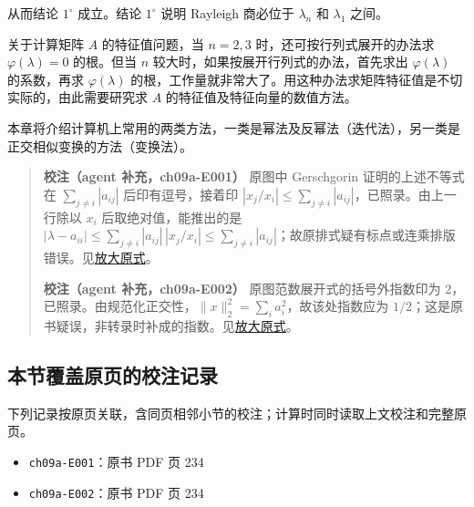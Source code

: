 \documentclass[
  10pt,
  fontset=fandol]{ctexart}
\providecommand{\tightlist}{%
  \setlength{\itemsep}{0pt}\setlength{\parskip}{0pt}}
\begin{document}
从而结论 \(1^\circ\) 成立。结论 \(1^\circ\) 说明 Rayleigh 商必位于 \(\lambda_n\) 和 \(\lambda_1\) 之间。

关于计算矩阵 \(A\) 的特征值问题，当 \(n=2,3\) 时，还可按行列式展开的办法求 \(\varphi(\lambda)=0\) 的根。但当 \(n\) 较大时，如果按展开行列式的办法，首先求出 \(\varphi(\lambda)\) 的系数，再求 \(\varphi(\lambda)\) 的根，工作量就非常大了。用这种办法求矩阵特征值是不切实际的，由此需要研究求 \(A\) 的特征值及特征向量的数值方法。

本章将介绍计算机上常用的两类方法，一类是幂法及反幂法（迭代法），另一类是正交相似变换的方法（变换法）。

\begin{quote}
\textbf{校注（agent 补充，ch09a-E001）} 原图中 Gerschgorin 证明的上述不等式在 \(\sum_{j\ne i}|a_{ij}|\) 后印有逗号，接着印 \(|x_j/x_i|\leq\sum_{j\ne i}|a_{ij}|\)，已照录。由上一行除以 \(x_i\) 后取绝对值，能推出的是 \(|\lambda-a_{ii}|\leq\sum_{j\ne i}|a_{ij}|\,|x_j/x_i|\leq\sum_{j\ne i}|a_{ij}|\)；故原排式疑有标点或连乘排版错误。见\href{../assets/ch09a/review-p234-gershgorin.png}{放大原式}。

\textbf{校注（agent 补充，ch09a-E002）} 原图范数展开式的括号外指数印为 \(2\)，已照录。由规范化正交性，\(\|x\|_2^2=\sum_i a_i^2\)，故该处指数应为 \(1/2\)；这是原书疑误，非转录时补成的指数。见\href{../assets/ch09a/review-p234-norm.png}{放大原式}。
\end{quote}

\subsection{本节覆盖原页的校注记录}\label{ux672cux8282ux8986ux76d6ux539fux9875ux7684ux6821ux6ce8ux8bb0ux5f55}

下列记录按原页关联，含同页相邻小节的校注；计算时同时读取上文校注和完整原页。

\begin{itemize}
\tightlist
\item
  \texttt{ch09a-E001}：原书 PDF 页 234
\item
  \texttt{ch09a-E002}：原书 PDF 页 234
\end{itemize}
\end{document}
